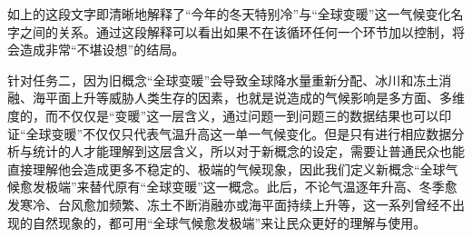 \documentclass[bwprint]{gmcmthesis}
\begin{document}
如上的这段文字即清晰地解释了“今年的冬天特别冷”与“全球变暖”这一气候变化名字之间的关系。通过这段解释可以看出如果不在该循环任何一个环节加以控制，将会造成非常“不堪设想”的结局。

针对任务二，因为旧概念“全球变暖”会导致全球降水量重新分配、冰川和冻土消融、海平面上升等威胁人类生存的因素，也就是说造成的气候影响是多方面、多维度的，而不仅仅是“变暖”这一层含义，通过问题一到问题三的数据结果也可以印证“全球变暖”不仅仅只代表气温升高这一单一气候变化。但是只有进行相应数据分析与统计的人才能理解到这层含义，所以对于新概念的设定，需要让普通民众也能直接理解他会造成更多不稳定的、极端的气候现象，因此我们定义新概念“全球气候愈发极端”来替代原有“全球变暖”这一概念。此后，不论气温逐年升高、冬季愈发寒冷、台风愈加频繁、冻土不断消融亦或海平面持续上升等，这一系列曾经不出现的自然现象的\cite{Palmer2004REPRESENTING}，都可用“全球气候愈发极端”来让民众更好的理解与使用\cite{Hastenrath1995Recent}。
















\newpage
\appendix
\end{document}
